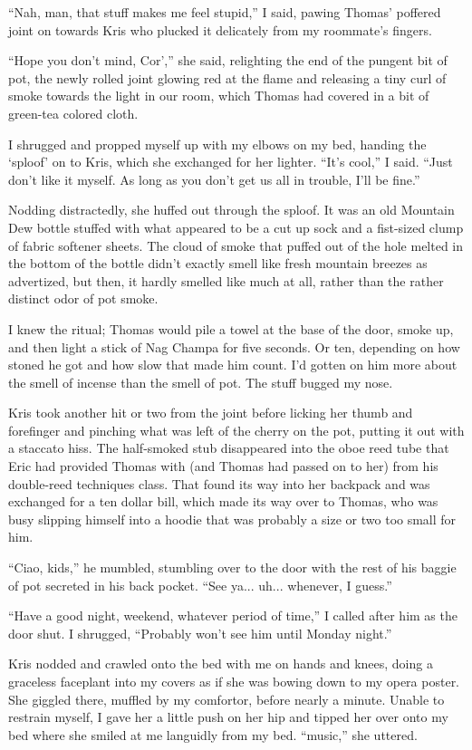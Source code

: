 ``Nah, man, that stuff makes me feel stupid,'' I said, pawing Thomas' poffered joint on towards Kris who plucked it delicately from my roommate's fingers.

``Hope you don't mind, Cor','' she said, relighting the end of the pungent bit of pot, the newly rolled joint glowing red at the flame and releasing a tiny curl of smoke towards the light in our room, which Thomas had covered in a bit of green-tea colored cloth.

I shrugged and propped myself up with my elbows on my bed, handing the `sploof' on to Kris, which she exchanged for her lighter.  ``It's cool,'' I said.  ``Just don't like it myself.  As long as you don't get us all in trouble, I'll be fine.''

Nodding distractedly, she huffed out through the sploof.  It was an old Mountain Dew bottle stuffed with what appeared to be a cut up sock and a fist-sized clump of fabric softener sheets.  The cloud of smoke that puffed out of the hole melted in the bottom of the bottle didn't exactly smell like fresh mountain breezes as advertized, but then, it hardly smelled like much at all, rather than the rather distinct odor of pot smoke.  

I knew the ritual; Thomas would pile a towel at the base of the door, smoke up, and then light a stick of Nag Champa for five seconds.  Or ten, depending on how stoned he got and how slow that made him count.  I'd gotten on him more about the smell of incense than the smell of pot.  The stuff bugged my nose.

Kris took another hit or two from the joint before licking her thumb and forefinger and pinching what was left of the cherry on the pot, putting it out with a staccato hiss.  The half-smoked stub disappeared into the oboe reed tube that Eric had provided Thomas with (and Thomas had passed on to her) from his double-reed techniques class.  That found its way into her backpack and was exchanged for a ten dollar bill, which made its way over to Thomas, who was busy slipping himself into a hoodie that was probably a size or two too small for him.

``Ciao, kids,'' he mumbled, stumbling over to the door with the rest of his baggie of pot secreted in his back pocket.  ``See ya... uh... whenever, I guess.''

``Have a good night, weekend, whatever period of time,'' I called after him as the door shut.  I shrugged, ``Probably won't see him until Monday night.''

Kris nodded and crawled onto the bed with me on hands and knees, doing a graceless faceplant into my covers as if she was bowing down to my opera poster.  She giggled there, muffled by my comfortor, before nearly a minute.  Unable to restrain myself, I gave her a little push on her hip and tipped her over onto my bed where she smiled at me languidly from my bed.  ``music,'' she uttered.

